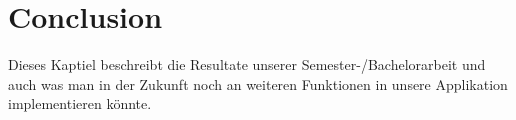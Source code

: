 \chapter{Conclusion}
\label{chap:Conclusion}

Dieses Kaptiel beschreibt die Resultate unserer Semester-/Bachelorarbeit und auch was man in der Zukunft noch an weiteren Funktionen in unsere Applikation implementieren könnte.


